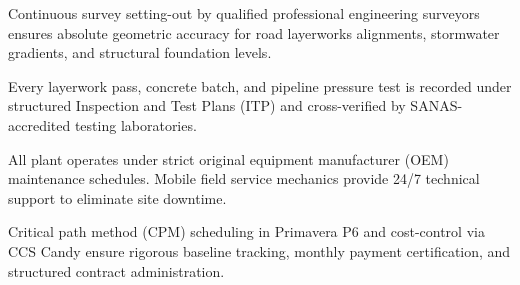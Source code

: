 \documentclass[a4paper,11pt]{article}
\providecommand{\faShieldAlt}{\faShield*}
\begin{document}
\renewcommand{\arraystretch}{1}

\vfill

\noindent
\begin{minipage}[t]{0.485\textwidth}
    \begin{tcolorbox}[enhanced, colback=white, colframe=mhlightgray, boxrule=0.8pt, arc=4pt, title={\bfseries\color{white}\faCrosshairs\ In-House Engineering Survey Control}, colbacktitle=mhnavy, left=8pt, right=8pt, top=7pt, bottom=7pt, drop shadow=black!4]
        {\fontsize{8.1pt}{11.3pt}\selectfont\color{mhtext}
        Continuous survey setting-out by qualified professional engineering surveyors ensures absolute geometric accuracy for road layerworks alignments, stormwater gradients, and structural foundation levels.
        }
    \end{tcolorbox}
\end{minipage}
\hfill
\begin{minipage}[t]{0.485\textwidth}
    \begin{tcolorbox}[enhanced, colback=white, colframe=mhlightgray, boxrule=0.8pt, arc=4pt, title={\bfseries\color{white}\faFlask\ Quality Control \& Laboratory Verification}, colbacktitle=mhblue, left=8pt, right=8pt, top=7pt, bottom=7pt, drop shadow=black!4]
        {\fontsize{8.1pt}{11.3pt}\selectfont\color{mhtext}
        Every layerwork pass, concrete batch, and pipeline pressure test is recorded under structured Inspection and Test Plans (ITP) and cross-verified by SANAS-accredited testing laboratories.
        }
    \end{tcolorbox}
\end{minipage}

\vspace{0.18cm}

\noindent
\begin{minipage}[t]{0.485\textwidth}
    \begin{tcolorbox}[enhanced, colback=white, colframe=mhlightgray, boxrule=0.8pt, arc=4pt, title={\bfseries\color{white}\faShieldAlt\ Preventive Maintenance Governance}, colbacktitle=mhnavy, left=8pt, right=8pt, top=7pt, bottom=7pt, drop shadow=black!4]
        {\fontsize{8.1pt}{11.3pt}\selectfont\color{mhtext}
        All plant operates under strict original equipment manufacturer (OEM) maintenance schedules. Mobile field service mechanics provide 24/7 technical support to eliminate site downtime.
        }
    \end{tcolorbox}
\end{minipage}
\hfill
\begin{minipage}[t]{0.485\textwidth}
    \begin{tcolorbox}[enhanced, colback=white, colframe=mhlightgray, boxrule=0.8pt, arc=4pt, title={\bfseries\color{white}\faProjectDiagram\ EPCM Project Management Governance}, colbacktitle=mhblue, left=8pt, right=8pt, top=7pt, bottom=7pt, drop shadow=black!4]
        {\fontsize{8.1pt}{11.3pt}\selectfont\color{mhtext}
        Critical path method (CPM) scheduling in Primavera P6 and cost-control via CCS Candy ensure rigorous baseline tracking, monthly payment certification, and structured contract administration.
        }
    \end{tcolorbox}
\end{minipage}
\end{document}
